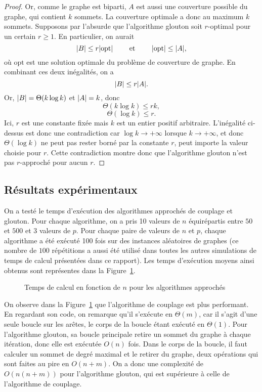 \documentclass[a4paper,11pt]{amsart}
\theoremstyle{plain}
\DeclarePairedDelimiter{\abs}{\lvert}{\rvert}
\begin{document}
\begin{proof}
Or, comme le graphe est biparti, $A$ est aussi une couverture possible du gra\-phe, qui contient $k$ sommets. La couverture optimale a donc au maximum $k$ sommets. Supposons par l'absurde que l'algorithme glouton soit $r$-optimal pour un certain $r \geq 1$. En particulier, on aurait
\[
\abs{B} \leq r \abs{\text{opt}} \qquad \text{ et } \qquad \abs{\text{opt}} \leq \abs{A},
\]
où $\text{opt}$ est une solution optimale du problème de couverture de graphe. En combinant ces deux inégalités, on a
\[
\abs{B} \leq r \abs{A}.
\]
Or, $\abs{B} = \Theta(k \log k)$ et $\abs{A} = k$, donc
\[
\Theta(k \log k) \leq r k,
\]
\[
\Theta(\log k) \leq r.
\]
Ici, $r$ est une constante fixée mais $k$ est un entier positif arbitraire. L'inégalité ci-dessus est donc une contradiction car $\log k \to +\infty$ lorsque $k \to +\infty$, et donc $\Theta(\log k)$ ne peut pas rester borné par la constante $r$, peut importe la valeur choisie pour $r$. Cette contradiction montre donc que l'algorithme glouton n'est pas $r$-approché pour aucun $r$.
\end{proof}

\subsection{Résultats expérimentaux}
\label{AlgoApproxExper}

On a testé le temps d'exécution des algorithmes approchés de couplage et glouton. Pour chaque algorithme, on a pris 10 valeurs de $n$ équirépartis entre $50$ et $500$ et 3 valeurs de $p$. Pour chaque paire de valeurs de $n$ et $p$, chaque algorithme a été exécuté 100 fois sur des instances aléatoires de graphes (ce nombre de $100$ répétitions a aussi été utilisé dans toutes les autres simulations de temps de calcul présentées dans ce rapport). Les temps d'exécution moyens ainsi obtenus sont représentes dans la Figure~\ref{FigPartie3question2tempsN}.

\begin{figure}[ht]
\centering
\resizebox{\textwidth}{!}{}
\caption{Temps de calcul en fonction de $n$ pour les algorithmes approchés}
\label{FigPartie3question2tempsN}
\end{figure}

On observe dans la Figure~\ref{FigPartie3question2tempsN} que l'algorithme de couplage est plus performant. En regardant son code, on remarque qu'il s'exécute en $\Theta(m)$, car il s'agit d'une seule boucle sur les arêtes, le corps de la boucle étant exécuté en $\Theta(1)$. Pour l'algorithme glouton, sa boucle principale retire un sommet du graphe à chaque itération, donc elle est exécutée $O(n)$ fois. Dans le corps de la boucle, il faut calculer un sommet de degré maximal et le retirer du graphe, deux opérations qui sont faites au pire en $O(n+m)$. On a donc une complexité de $O(n(n+m))$ pour l'algorithme glouton, qui est supérieure à celle de l'algorithme de couplage.
\end{document}

